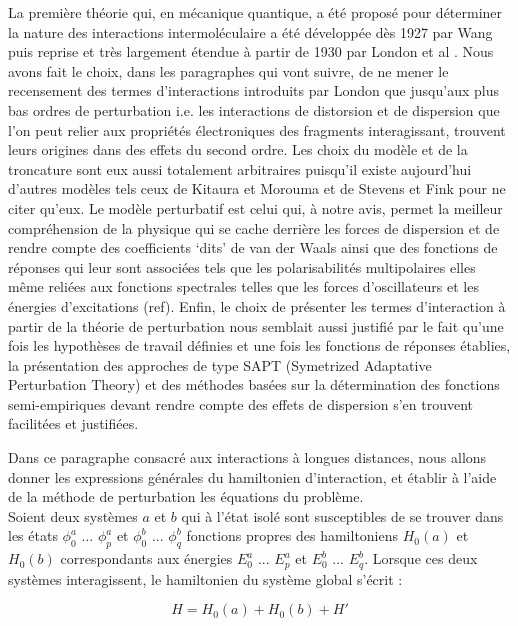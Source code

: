 La première théorie qui, en mécanique quantique, a été proposé pour déterminer la nature des interactions intermoléculaire a été développée dès 1927 par Wang \cite{wang1927mutual}  puis reprise et très largement étendue à partir de 1930 par London et al \cite{london1930z}. Nous avons fait le choix, dans les paragraphes qui vont suivre, de ne mener le recensement des termes d’interactions introduits par London que jusqu’aux plus bas ordres de perturbation i.e. les interactions de distorsion et de dispersion que l’on peut relier aux propriétés électroniques des fragments interagissant, trouvent leurs origines dans des effets du second ordre. Les choix du modèle et de la troncature sont eux aussi totalement arbitraires puisqu’il existe aujourd’hui d’autres modèles tels ceux de  Kitaura et Morouma \cite{morokuma1977molecules} et de Stevens et Fink \cite{stevens1987frozen} pour ne citer qu’eux. Le modèle perturbatif est celui qui, à notre avis, permet la meilleur compréhension de la physique qui se cache derrière les forces de dispersion et de rendre compte des coefficients ‘dits’ de van der Waals ainsi que des fonctions de réponses qui leur sont associées tels que les polarisabilités multipolaires elles même reliées aux fonctions spectrales telles que les forces d’oscillateurs et les énergies d’excitations (ref). Enfin, le choix de présenter les termes d’interaction à partir de la théorie de perturbation nous semblait aussi justifié par le fait qu’une fois les hypothèses de travail définies et une fois les fonctions de réponses établies, la présentation des approches de type SAPT (Symetrized Adaptative Perturbation Theory) et des méthodes basées sur la détermination des fonctions semi-empiriques devant rendre compte des effets de dispersion s’en trouvent facilitées et justifiées.


Dans ce paragraphe consacré aux interactions à longues distances, nous allons donner les expressions générales du hamiltonien d'interaction, et établir à l'aide de la méthode de perturbation les équations du problème.\\ 

Soient deux systèmes $a$ et $b$ qui à l'état isolé sont susceptibles de se trouver dans les états $\phi_{0}^{a}$ ... $\phi_{p}^{a}$ et $\phi_{0}^{b}$ ... $\phi_{q}^{b}$ fonctions propres des hamiltoniens $H_{0}(a)$ et $H_{0}(b)$ correspondants aux énergies $E_{0}^{a}$ ... $E_{p}^{a}$ et $E_{0}^{b}$ ... $E_{q}^{b}$. Lorsque ces deux systèmes interagissent, le hamiltonien du système global s'écrit : 

\begin{equation}
H = H_{0}(a) + H_{0}(b) + H'
\end{equation}


